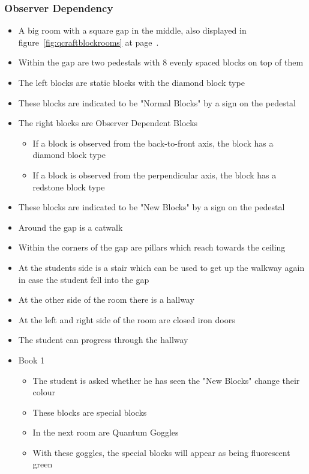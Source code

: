 \documentclass[11pt,twoside]{report} %
\begin{document}
\subsubsection{Observer Dependency}
\begin{itemize}
	\item A big room with a square gap in the middle, also displayed in figure~\ref{fig:qcraftblockrooms} at page~\pageref{fig:qcraftblockrooms}.
	\item Within the gap are two pedestals with 8 evenly spaced blocks on top of them
	\item The left blocks are static blocks with the diamond block type
	\item These blocks are indicated to be "Normal Blocks" by a sign on the pedestal
	\item The right blocks are Observer Dependent Blocks
	\begin{itemize}
		\item If a block is observed from the back-to-front axis, the block has a diamond block type
		\item If a block is observed from the perpendicular axis, the block has a redstone block type
	\end{itemize}
	\item These blocks are indicated to be "New Blocks" by a sign on the pedestal
	\item Around the gap is a catwalk
	\item Within the corners of the gap are pillars which reach towards the ceiling
	\item At the students side is a stair which can be used to get up the walkway again in case the student fell into the gap
	\item At the other side of the room there is a hallway
	\item At the left and right side of the room are closed iron doors
	\item The student can progress through the hallway
	\item Book 1
	\begin{itemize}
		\item The student is asked whether he has seen the "New Blocks" change their colour
		\item These blocks are special blocks
		\item In the next room are Quantum Goggles
		\item With these goggles, the special blocks will appear as being fluorescent green
	\end{itemize}

\end{itemize}
\end{document}
